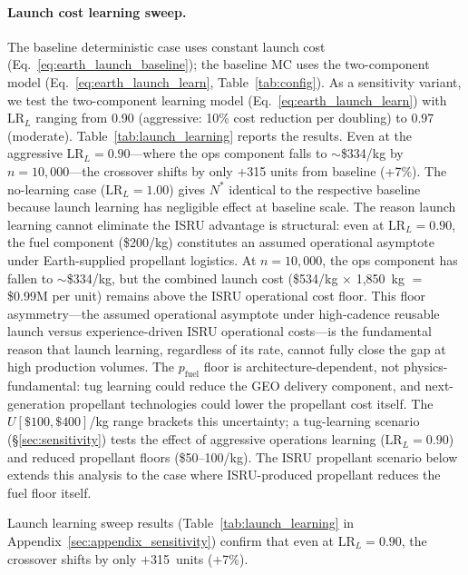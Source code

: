 \documentclass[5p,twocolumn]{elsarticle}
\begin{document}
\paragraph{Launch cost learning sweep.} The baseline deterministic case uses constant launch cost (Eq.~\ref{eq:earth_launch_baseline}); the baseline MC uses the two-component model (Eq.~\ref{eq:earth_launch_learn}, Table~\ref{tab:config}). As a sensitivity variant, we test the two-component learning model (Eq.~\ref{eq:earth_launch_learn}) with $\mathrm{LR}_L$ ranging from 0.90 (aggressive: 10\% cost reduction per doubling) to 0.97 (moderate). Table~\ref{tab:launch_learning} reports the results. Even at the aggressive $\mathrm{LR}_L = 0.90$---where the ops component falls to $\sim$\$334/kg by $n = 10{,}000$---the crossover shifts by only $+$315 units from baseline (+7\%). The no-learning case ($\mathrm{LR}_L = 1.00$) gives $N^*$ identical to the respective baseline because launch learning has negligible effect at baseline scale. The reason launch learning cannot eliminate the ISRU advantage is structural: even at $\mathrm{LR}_L = 0.90$, the fuel component (\$200/kg) constitutes an assumed operational asymptote under Earth-supplied propellant logistics. At $n = 10{,}000$, the ops component has fallen to $\sim$\$334/kg, but the combined launch cost (\$534/kg $\times$ 1{,}850~kg $=$ \$0.99M per unit) remains above the ISRU operational cost floor. This floor asymmetry---the assumed operational asymptote under high-cadence reusable launch versus experience-driven ISRU operational costs---is the fundamental reason that launch learning, regardless of its rate, cannot fully close the gap at high production volumes. The $p_{\mathrm{fuel}}$ floor is architecture-dependent, not physics-fundamental: tug learning could reduce the GEO delivery component, and next-generation propellant technologies could lower the propellant cost itself. The $U[\$100, \$400]$/kg range brackets this uncertainty; a tug-learning scenario (\S\ref{sec:sensitivity}) tests the effect of aggressive operations learning ($\mathrm{LR}_L = 0.90$) and reduced propellant floors (\$50--100/kg). The ISRU propellant scenario below extends this analysis to the case where ISRU-produced propellant reduces the fuel floor itself.

Launch learning sweep results (Table~\ref{tab:launch_learning} in Appendix~\ref{sec:appendix_sensitivity}) confirm that even at $\mathrm{LR}_L = 0.90$, the crossover shifts by only $+$315~units ($+$7\%).
\end{document}
